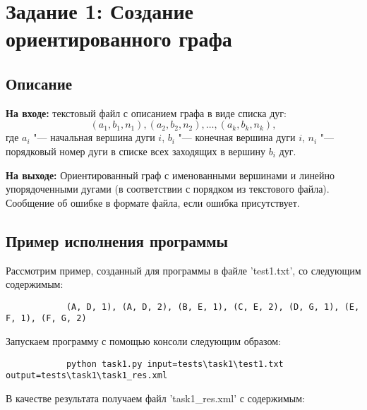 \documentclass[bachelor, och, report]{../shiza}
\begin{document}

\tableofcontents

\section{Задание 1: Создание ориентированного графа}
    \subsection{Описание}

        \textbf{На входе:} текстовый файл с описанием графа в виде списка дуг:
        \[(a_1, b_1, n_1), (a_2, b_2, n_2), \dots, (a_k, b_k, n_k),\] где $a_i$
        "--- начальная вершина дуги $i$, $b_i$ "--- конечная вершина дуги $i$,
        $n_i$ "--- порядковый номер дуги в списке всех заходящих в вершину $b_i$
        дуг.

        \textbf{На выходе:} Ориентированный граф с именованными вершинами и
        линейно упорядоченными дугами (в соответствии с порядком из текстового
        файла). Сообщение об ошибке в формате файла, если ошибка присутствует.
        

    \subsection{Пример исполнения программы}

        Рассмотрим пример, созданный для программы в файле 'test1.txt', со
        следующим содержимым:

        \begin{verbatim}
            (A, D, 1), (A, D, 2), (B, E, 1), (C, E, 2), (D, G, 1), (E, F, 1), (F, G, 2)
        \end{verbatim}

        Запускаем программу с помощью консоли следующим образом:

        \begin{verbatim}
            python task1.py input=tests\task1\test1.txt output=tests\task1\task1_res.xml
        \end{verbatim}

        В качестве результата получаем файл 'task1_res.xml' с содержимым:
\end{document}
